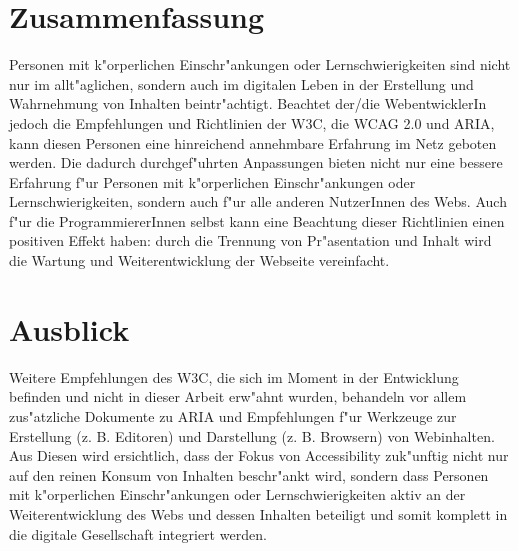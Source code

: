 \documentclass[a4paper,bibtotoc,oneside]{scrbook}
\begin{document}
\chapter{Zusammenfassung}
Personen mit k"orperlichen Einschr"ankungen oder Lernschwierigkeiten sind nicht nur im allt"aglichen, sondern auch im digitalen Leben in der Erstellung und Wahrnehmung von Inhalten beintr"achtigt. Beachtet der/die WebentwicklerIn jedoch die Empfehlungen und Richtlinien der W3C, die WCAG 2.0 und ARIA, kann diesen Personen eine hinreichend annehmbare Erfahrung im Netz geboten werden. Die dadurch durchgef"uhrten Anpassungen bieten nicht nur eine bessere Erfahrung f"ur Personen mit k"orperlichen Einschr"ankungen oder Lernschwierigkeiten, sondern auch f"ur alle anderen NutzerInnen des Webs. Auch f"ur die ProgrammiererInnen selbst kann eine Beachtung dieser Richtlinien einen positiven Effekt haben: durch die Trennung von Pr"asentation und Inhalt wird die Wartung und Weiterentwicklung der Webseite vereinfacht. 

\chapter{Ausblick}
Weitere Empfehlungen des W3C, die sich im Moment in der Entwicklung befinden und nicht in dieser Arbeit erw"ahnt wurden, behandeln vor allem zus"atzliche Dokumente zu ARIA und Empfehlungen f"ur Werkzeuge zur Erstellung (z. B. Editoren) und Darstellung (z. B. Browsern) von Webinhalten. Aus Diesen wird ersichtlich, dass der Fokus von Accessibility zuk"unftig nicht nur auf den reinen Konsum von Inhalten beschr"ankt wird, sondern dass Personen mit k"orperlichen Einschr"ankungen oder Lernschwierigkeiten aktiv an der Weiterentwicklung des Webs und dessen Inhalten beteiligt und somit komplett in die digitale Gesellschaft integriert werden. \cite{acc_all}







\end{document}

